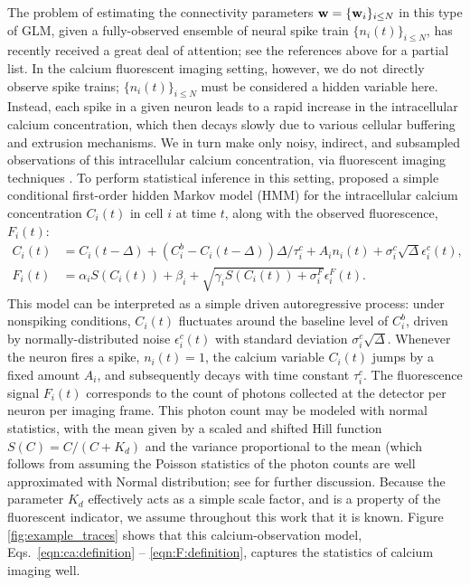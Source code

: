 The problem of estimating the connectivity parameters $\mathbf{w}=\{\mathbf{w}_i\}_{i\leq N}$ in this type of GLM, given a fully-observed ensemble of neural spike train $\{n_i(t)\}_{i\leq N}$, has recently received a great deal of attention; see the references above for a partial list. In the calcium fluorescent imaging setting, however, we do not directly observe spike trains; $\{n_i(t)\}_{i\leq N}$ must be considered a hidden variable here. Instead, each spike in a given neuron leads to a rapid increase in the intracellular calcium concentration, which then decays slowly due to various cellular buffering and extrusion mechanisms. We in turn make only noisy, indirect, and subsampled observations of this intracellular calcium concentration, via fluorescent imaging techniques \cite{ImagingManual}. To perform statistical inference in this setting, \cite{Vogelstein2009} proposed a simple conditional first-order hidden Markov model (HMM) for the intracellular calcium concentration $C_i(t)$ in cell $i$ at time $t$, along with the observed fluorescence, $F_i(t)$:
\begin{align}
\label{eqn:ca:definition}
C_i(t) &= C_i(t-\Delta) + (C_i^b-C_i(t-\Delta)) \Delta/\tau^c_i + A_i
n_i(t)+\sigma^c_i \sqrt{\Delta} \epsilon^c_i(t), \\ F_i(t) &= \alpha_i
S(C_i(t)) + \beta_i + \sqrt{\gamma_i S(C_i(t)) + \sigma^F_i}
\epsilon^F_i(t). \label{eqn:F:definition}
\end{align}
This model can be interpreted as a simple driven autoregressive process: under nonspiking conditions, $C_i(t)$ fluctuates around the baseline level of $C_i^b$, driven by normally-distributed noise $\epsilon^c_i(t)$ with standard deviation $\sigma^c_i \sqrt{\Delta}$. Whenever the neuron fires a spike, $n_i(t)=1$, the calcium variable $C_i(t)$ jumps by a fixed amount $A_i$, and subsequently decays with time constant $\tau^c_i$. The fluorescence signal $F_i(t)$ corresponds to the count of photons collected at the detector per neuron per imaging frame. This photon count may be modeled with normal statistics, with the mean given by a scaled and shifted Hill function $S(C)=C/(C+K_d)$ \cite{Yasuda2004} and the variance proportional to the mean (which follows from assuming the Poisson statistics of the photon counts are well approximated with Normal distribution; see \cite{Vogelstein2009} for further discussion. Because the parameter $K_d$ effectively acts as a simple scale factor, and is a property of the fluorescent indicator, we assume throughout this work that it is known. Figure \ref{fig:example_traces} shows that this calcium-observation model, Eqs.~\eqref{eqn:ca:definition} -- \eqref{eqn:F:definition}, captures the statistics of calcium imaging well.


